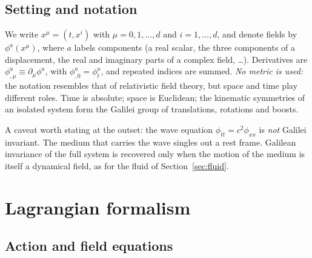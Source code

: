 \subsection{Setting and notation}

We write $x^\mu=(t,x^i)$ with $\mu=0,1,\dots,d$ and $i=1,\dots,d$, and denote
fields by $\phi^a(x^\mu)$, where $a$ labels components (a real scalar, the three
components of a displacement, the real and imaginary parts of a complex
field, \dots). Derivatives are $\phi^a_{,\mu}\equiv\partial_\mu\phi^a$, with
$\phi^a_{,0}=\phi^a_t$, and repeated indices are summed. \emph{No metric is
used:} the notation resembles that of relativistic field theory, but space and
time play different roles. Time is absolute; space is Euclidean; the kinematic
symmetries of an isolated system form the Galilei group of translations,
rotations and boosts.

A caveat worth stating at the outset: the wave equation
$\phi_{tt}=c^2\phi_{xx}$ is \emph{not} Galilei invariant. The medium that carries
the wave singles out a rest frame. Galilean invariance of the full system is
recovered only when the motion of the medium is itself a dynamical field, as
for the fluid of Section~\ref{sec:fluid}.

\section{Lagrangian formalism}
\label{sec:lagrangian}

\subsection{Action and field equations}

